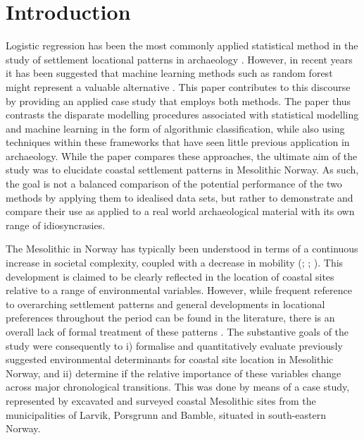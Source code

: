 \documentclass[12pt, a4paper]{article}
\begin{document}
\section{Introduction}
Logistic regression has been the most commonly applied statistical method in the study of settlement locational patterns in archaeology \citep[e.g.][]{kvamme1988, warren2000, woodman2002, verhagen2020}. However, in recent years it has been suggested that machine learning methods such as random forest might represent a valuable alternative \citep[e.g.][]{verhagen2012, harris2015}. This paper contributes to this discourse by providing an applied case study that employs both methods. The paper thus contrasts the disparate modelling procedures associated with statistical modelling and machine learning in the form of algorithmic classification, while also using techniques within these frameworks that have seen little previous application in archaeology. While the paper compares these approaches, the ultimate aim of the study was to elucidate coastal settlement patterns in Mesolithic Norway. As such, the goal is not a balanced comparison of the potential performance of the two methods by applying them to idealised data sets, but rather to demonstrate and compare their use as applied to a real world archaeological material with its own range of idiosyncrasies.\par
The Mesolithic in Norway has typically been understood in terms of a continuous increase in societal complexity, coupled with a decrease in mobility (\citealp[e.g.][]{bergsvik2001}; \citealp{bjerck2008}; \citealp[97]{glorstad2010}). This development is claimed to be clearly reflected in the location of coastal sites relative to a range of environmental variables. However, while frequent reference to overarching settlement patterns and general developments in locational preferences throughout the period can be found in the literature, there is an overall lack of formal treatment of these patterns \citep{aastveit2014}. The substantive goals of the study were consequently to i) formalise and quantitatively evaluate previously suggested environmental determinants for coastal site location in Mesolithic Norway, and ii) determine if the relative importance of these variables change across major chronological transitions. This was done by means of a case study, represented by excavated and surveyed coastal Mesolithic sites from the municipalities of Larvik, Porsgrunn and Bamble, situated in south-eastern Norway. \par 
\end{document}
